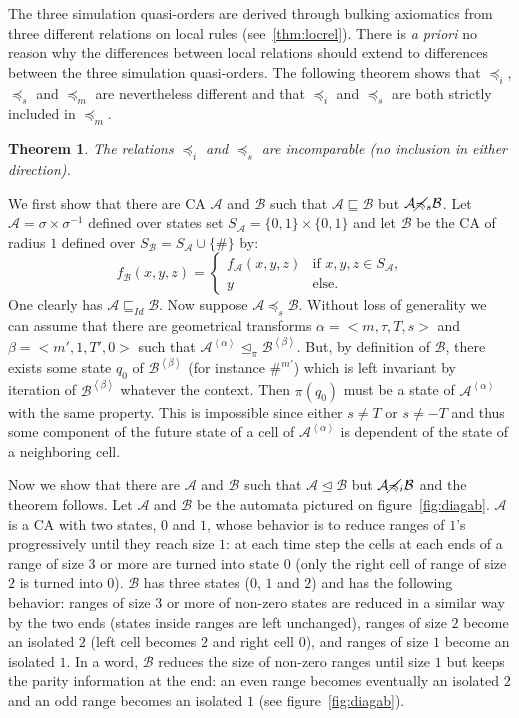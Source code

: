 \documentclass[a4paper]{elsarticle}
\newcommand{\ACA}{\mathcal{A}}
\newcommand{\ACB}{\mathcal{B}}
\newcommand{\locA}{f_{\ACA}}
\newcommand{\locB}{f_{\ACB}}
\newcommand\alphabe[1]{S_{#1}}
\newcommand{\alphA}{\alphabe{\ACA}}
\newcommand{\alphB}{\alphabe{\ACB}}
\newcommand\sac{\sqsubseteq}
\newcommand{\fac}{\trianglelefteq}
\newcommand\bulk[2]{{#1}^{\left\langle{#2}\right\rangle}}
\newcommand{\simu}{\preccurlyeq}
\newcommand{\sacsimu}{\simu_i}
\newcommand{\facsimu}{\simu_s}
\newcommand{\facsacsimu}{\simu_m}
\newtheorem{thm}{Theorem}[section]
\begin{document}
The three simulation quasi-orders are derived through bulking
axiomatics from three different relations on local rules
(see~\ref{thm:locrel}). There is \textit{a priori} no reason why the
differences between local relations should extend to differences
between the three simulation quasi-orders. The following theorem shows
that $\sacsimu$, $\facsimu$ and $\facsacsimu$ are nevertheless
different and that $\sacsimu$ and $\facsimu$ are both strictly
included in $\facsacsimu$.

\begin{thm}
  The relations $\sacsimu$ and $\facsimu$ are incomparable (no
  inclusion in either direction).
\end{thm}
\begin{pf}
  We first show that there are CA $\ACA$ and $\ACB$ such that
  ${\ACA\sac\ACB}$ but ${\ACA\cancel\facsimu\ACB}$.  Let ${\ACA =
    \sigma\times\sigma^{-1}}$ defined over states set ${\alphA =
    \{0,1\}\times\{0,1\}}$ and let $\ACB$ be the CA of radius $1$
  defined over ${\alphB = \alphA\cup\{\#\}}$ by:
  \[\locB(x,y,z) =
  \begin{cases}
    \locA(x,y,z) &\text{if $x,y,z\in\alphA$,}\\
    y &\text{else.}
  \end{cases}\]
  One clearly has ${\ACA\sac_{Id}\ACB}$. Now suppose
  ${\ACA\facsimu\ACB}$. Without loss of generality we can assume
  that there are geometrical transforms ${\alpha=<m,\tau,T,s>}$ and
  ${\beta=<m',1,T',0>}$ such that
  ${\bulk{\ACA}{\alpha}\fac_\pi\bulk{\ACB}{\beta}}$. But, by
  definition of $\ACB$, there exists some state $q_0$ of
  $\bulk{\ACB}{\beta}$ (for instance $\#^{m'}$) which is left
  invariant by iteration of ${\bulk{\ACB}{\beta}}$ whatever the
  context. Then $\pi(q_0)$ must be a state of $\bulk{\ACA}{\alpha}$
  with the same property. This is impossible since either
  ${s\not=T}$ or ${s\not=-T}$ and thus some component of the future
  state of a cell of $\bulk{\ACA}{\alpha}$ is dependent of the state
  of a neighboring cell.
  

  Now we show that there are $\ACA$ and $\ACB$ such that
  ${\ACA\fac\ACB}$ but ${\ACA\cancel\sacsimu\ACB}$ and the theorem
  follows.  Let $\ACA$ and $\ACB$ be the automata pictured on
  figure~\ref{fig:diagab}. $\ACA$ is a CA with two states, $0$ and
  $1$, whose behavior is to reduce ranges of $1$'s progressively until
  they reach size $1$: at each time step the cells at each ends of a
  range of size $3$ or more are turned into state $0$ (only the right
  cell of range of size $2$ is turned into $0$). $\ACB$ has three
  states ($0$, $1$ and $2$) and has the following behavior: ranges of
  size $3$ or more of non-zero states are reduced in a similar way by
  the two ends (states inside ranges are left unchanged), ranges of
  size $2$ become an isolated $2$ (left cell becomes $2$ and right
  cell $0$), and ranges of size $1$ become an isolated $1$. In a word,
  $\ACB$ reduces the size of non-zero ranges until size $1$ but keeps
  the parity information at the end: an even range becomes eventually
  an isolated $2$ and an odd range becomes an isolated $1$ (see
  figure~\ref{fig:diagab}).


\end{pf}
\end{document}
